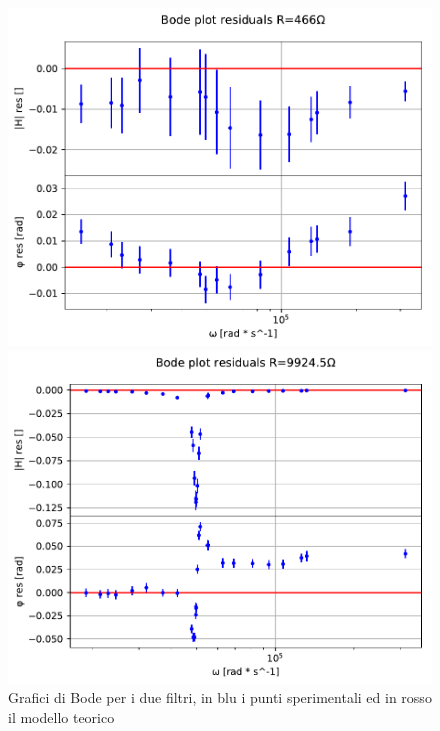 \documentclass{article}
\begin{document}
\begin{figure}[H]
    \centering
    \begin{minipage}{0.5\textwidth}
        \centering
        \includegraphics[width=\textwidth]{bodefilter1_res.pdf} 
    \end{minipage}\hfill
    \begin{minipage}{0.5\textwidth}
        \centering
        \includegraphics[width=\textwidth]{bodefilter2_res.pdf} 
    \end{minipage}
    \caption{Grafici di Bode per i due filtri, in blu i punti sperimentali ed in rosso il modello teorico}
    \label{fig:RCLfilter}
\end{figure}
\end{document}
